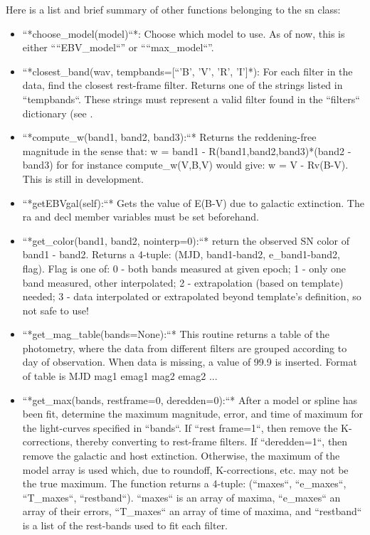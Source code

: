 Here is a list and brief summary of other functions belonging to the
sn class:
\begin{itemize}
\item ``*choose_model(model)``*: Choose which model to use.
As of now, this is either ````EBV_model``'' or ````max_model``''.
\item ``*closest_band(wav, tempbands={[``'B', 'V', 'R', 'I'{]*)}}:
For each filter in the data, find the closest rest-frame filter. Returns
one of the strings listed in ``tempbands``. These strings must
represent a valid filter found in the ``filters`` dictionary
(see .
\item ``*compute_w(band1, band2, band3):``* Returns the reddening-free
magnitude in the sense that: w = band1 - R(band1,band2,band3){*}(band2
- band3) for for instance compute_w(V,B,V) would give: w = V - Rv(B-V).
This is still in development.
\item ``*getEBVgal(self):``* Gets the value of E(B-V) due to
galactic extinction. The ra and decl member variables must be set
beforehand. 
\item ``*get_color(band1, band2, nointerp=0):``* return the
observed SN color of band1 - band2. Returns a 4-tuple: (MJD, band1-band2,
e_band1-band2, flag). Flag is one of: 0 - both bands measured at
given epoch; 1 - only one band measured, other interpolated; 2 - extrapolation
(based on template) needed; 3 - data interpolated or extrapolated
beyond template's definition, so not safe to use!
\item ``*get_mag_table(bands=None):``* This routine returns
a table of the photometry, where the data from different filters are
grouped according to day of observation. When data is missing, a value
of 99.9 is inserted. Format of table is \textquotedbl{}MJD mag1 emag1
mag2 emag2 ... 
\item ``*get_max(bands, restframe=0, deredden=0):``* After
a model or spline has been fit, determine the maximum magnitude, error,
and time of maximum for the light-curves specified in ``bands``.
If ``rest frame=1``, then remove the K-corrections, thereby converting
to rest-frame filters. If ``deredden=1``, then remove the galactic
and host extinction. Otherwise, the maximum of the model array is
used which, due to roundoff, K-corrections, etc. may not be the true
maximum. The function returns a 4-tuple: (``maxes``, ``e_maxes``,
``T_maxes``, ``restband``). ``maxes`` is an array
of maxima, ``e_maxes`` an array of their errors, ``T_maxes``
an array of time of maxima, and ``restband`` is a list of the
rest-bands used to fit each filter.

\end{itemize}
